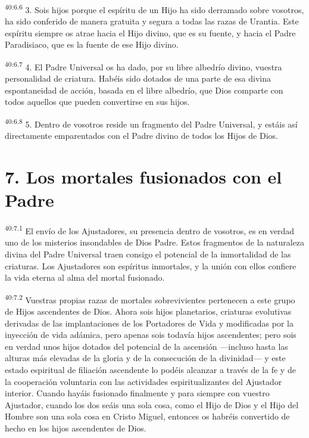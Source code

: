 \par
\textsuperscript{40:6.6} 3. Sois hijos porque el espíritu de un Hijo ha sido derramado sobre vosotros, ha sido conferido de manera gratuita y segura a todas las razas de Urantia. Este espíritu siempre os atrae hacia el Hijo divino, que es su fuente, y hacia el Padre Paradisiaco, que es la fuente de ese Hijo divino.

\par
\textsuperscript{40:6.7} 4. El Padre Universal os ha dado, por su libre albedrío divino, vuestra personalidad de criatura. Habéis sido dotados de una parte de esa divina espontaneidad de acción, basada en el libre albedrío, que Dios comparte con todos aquellos que pueden convertirse en sus hijos.

\par
\textsuperscript{40:6.8} 5. Dentro de vosotros reside un fragmento del Padre Universal, y estáis así directamente emparentados con el Padre divino de todos los Hijos de Dios.

\section*{7. Los mortales fusionados con el Padre}
\par
\textsuperscript{40:7.1} El envío de los Ajustadores, su presencia dentro de vosotros, es en verdad uno de los misterios insondables de Dios Padre. Estos fragmentos de la naturaleza divina del Padre Universal traen consigo el potencial de la inmortalidad de las criaturas. Los Ajustadores son espíritus inmortales, y la unión con ellos confiere la vida eterna al alma del mortal fusionado.

\par
\textsuperscript{40:7.2} Vuestras propias razas de mortales sobrevivientes pertenecen a este grupo de Hijos ascendentes de Dios. Ahora sois hijos planetarios, criaturas evolutivas derivadas de las implantaciones de los Portadores de Vida y modificadas por la inyección de vida adámica, pero apenas sois todavía hijos ascendentes; pero sois en verdad unos hijos dotados del potencial de la ascensión ---incluso hasta las alturas más elevadas de la gloria y de la consecución de la divinidad--- y este estado espiritual de filiación ascendente lo podéis alcanzar a través de la fe y de la cooperación voluntaria con las actividades espiritualizantes del Ajustador interior. Cuando hayáis fusionado finalmente y para siempre con vuestro Ajustador, cuando los dos seáis una sola cosa, como el Hijo de Dios y el Hijo del Hombre son una sola cosa en Cristo Miguel, entonces os habréis convertido de hecho en los hijos ascendentes de Dios.

